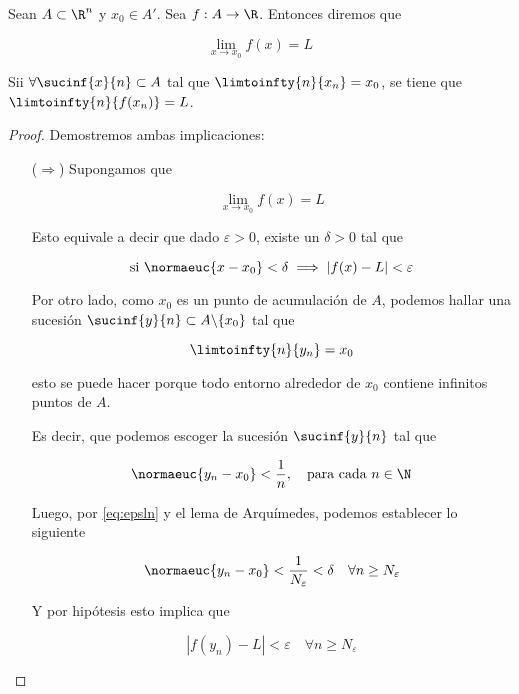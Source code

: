 \begin{teo}
    Sean $A \subset \R^n$ y $x_0 \in A'$. Sea $f: A \rightarrow \R$. Entonces diremos que
    
    \[
    \lim_{x \to x_0} f(x) = L
    \]
    
    Sii $\forall \sucinf{x}{n} \subset A$ tal que $\limtoinfty{n}{x_n} = x_0$, se tiene que $\limtoinfty{n}{f(x_n)} = L$.
\end{teo}

\begin{proof}
    Demostremos ambas implicaciones:
    
    \begin{itemize}
        \item[($\Rightarrow$)] Supongamos que
        
        \[
        \lim_{x \to x_0} f(x) = L
        \]
        
        Esto equivale a decir que dado $\varepsilon > 0$, existe un $\delta > 0$ tal que
        
        \begin{equation}\label{eq:epsln}
            \text{si $\normaeuc{x - x_0} < \delta$} \implies |f(x) - L| < \varepsilon
        \end{equation}
        
        Por otro lado, como $x_0$ es un punto de acumulación de $A$, podemos hallar una sucesión $\sucinf{y}{n} \subset A \backslash \{x_0\}$ tal que
        
        \[
        \limtoinfty{n}{y_n} = x_0
        \]
        
        \noindent esto se puede hacer porque todo entorno alrededor de $x_0$ contiene infinitos puntos de $A$.
        
        Es decir, que podemos escoger la sucesión $\sucinf{y}{n}$ tal que
        
        \[
        \normaeuc{y_n - x_0} < \frac{1}{n}, \quad \text{para cada $n \in \N$}
        \]
        
        Luego, por \ref{eq:epsln} y el lema de Arquímedes, podemos establecer lo siguiente
        
        \[
        \normaeuc{y_n - x_0} < \frac{1}{N_{\varepsilon}} < \delta \quad \forall n \geq N_{\varepsilon}
        \]
        
        Y por hipótesis esto implica que
        
        \[
        |f(y_n) - L| < \varepsilon \quad \forall n \geq N_{\varepsilon}
        \]
        

\end{itemize}
\end{proof}
